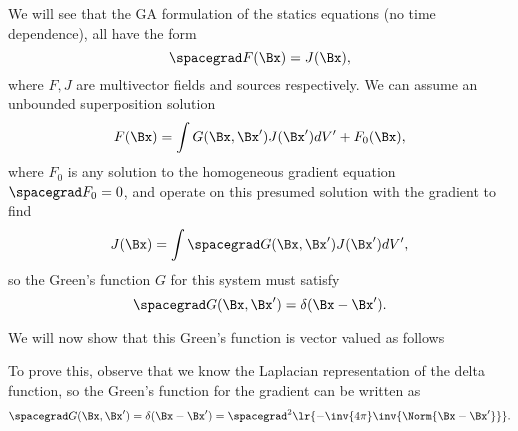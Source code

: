 %
%


We will see that the GA formulation of the statics equations (no time dependence), all have the form
\begin{dmath}\label{eqn:greensFunctionGradient:420}
\spacegrad F(\Bx) = J(\Bx),
\end{dmath}
where \( F, J \) are multivector fields and sources respectively.  We can assume an unbounded superposition solution
\begin{dmath}\label{eqn:greensFunctionGradient:440}
F(\Bx) = \int G(\Bx, \Bx') J(\Bx') dV' + F_0(\Bx),
\end{dmath}
where \( F_0 \) is any solution to the homogeneous gradient equation \( \spacegrad F_0 = 0 \), and operate on this presumed solution with the gradient to find
\begin{dmath}\label{eqn:greensFunctionGradient:460}
J(\Bx)
= \int \spacegrad G(\Bx, \Bx') J(\Bx') dV',
\end{dmath}
so the Green's function \( G \) for this system must satisfy
\begin{dmath}\label{eqn:greensFunctionGradient:480}
\spacegrad G(\Bx, \Bx') = \delta( \Bx - \Bx' ).
\end{dmath}

We will now show that this Green's function is vector valued as follows


To prove this, observe that we know the Laplacian representation of the delta function, so
the Green's function for the gradient can be written as
\begin{equation}\label{eqn:greensFunctionGradient:481}
\spacegrad G(\Bx, \Bx') = \delta( \Bx - \Bx' ) = \spacegrad^2 \lr{ -\inv{4\pi} \inv{ \Norm{\Bx - \Bx'} } }.
\end{equation}

